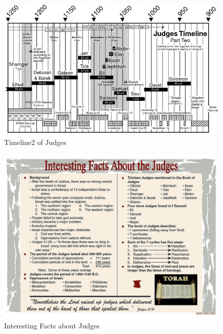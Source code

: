 \newpage
\begin{figure}
\begin{center}
\includegraphics[scale=0.6, angle=90]{07OT-Judges/References/11.Timeline2-Judges}
\caption[Timeline2 of Judges]{Timeline2 of Judges}
\label{fig:Timeline2 of Judges}
\end{center}
\end{figure}


\newpage
\begin{figure}
\begin{center}
\includegraphics[scale=0.6, angle=90]{07OT-Judges/References/14.InterestingFactsonJudges}
\caption[Interesting Facts about Judges]{Interesting Facts about Judges}
\label{fig:Interesting Facts about Judges}
\end{center}
\end{figure}

